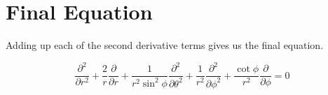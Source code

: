 \documentclass{article}
\begin{document}
\section{Final Equation}

Adding up each of the second derivative terms gives us the final equation.

$$\frac{\partial^{2}}{\partial r^{2}} + \frac{2}{r}\frac{\partial}{\partial r} + \frac{1}{r^{2}\sin^{2}\phi}\frac{\partial^{2}}{\partial\theta^{2}} + \frac{1}{r^{2}}\frac{\partial^{2}}{\partial \phi^{2}}+\frac{\cot\phi}{r^{2}}\frac{\partial}{\partial \phi}=0$$
\end{document}
